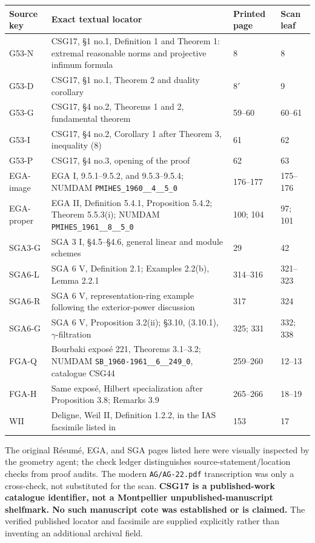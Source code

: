 \documentclass[11pt]{article}
\begin{document}
\begingroup\small
\begin{longtable}{p{2.1cm}p{7.7cm}p{1.5cm}p{1.5cm}}
\toprule
Source key & Exact textual locator & Printed page & Scan leaf\\\midrule
\endhead
G53-N & CSG17, \S1 no.1, Definition 1 and Theorem 1:
extremal reasonable norms and projective infimum formula & 8 & 8\\
G53-D & CSG17, \S1 no.1, Theorem 2 and duality corollary & $8'$ & 9\\
G53-G & CSG17, \S4 no.2, Theorems 1 and 2, fundamental theorem & 59--60 & 60--61\\
G53-I & CSG17, \S4 no.2, Corollary 1 after Theorem 3,
inequality (8) & 61 & 62\\
G53-P & CSG17, \S4 no.3, opening of the proof & 62 & 63\\
EGA-image & EGA I, 9.5.1--9.5.2, and 9.5.3--9.5.4;
NUMDAM \texttt{PMIHES\_1960\_\_4\_\_5\_0} & 176--177 & 175--176\\
EGA-proper & EGA II, Definition 5.4.1, Proposition 5.4.2;
Theorem 5.5.3(i); NUMDAM \texttt{PMIHES\_1961\_\_8\_\_5\_0}
& 100; 104 & 97; 101\\
SGA3-G & SGA 3 I, \S4.5--\S4.6, general linear and module schemes & 29 & 42\\
SGA6-L & SGA 6 V, Definition 2.1; Examples 2.2(b),
Lemma 2.2.1 & 314--316 & 321--323\\
SGA6-R & SGA 6 V, representation-ring example following the
exterior-power discussion & 317 & 324\\
SGA6-G & SGA 6 V, Proposition 3.2(ii);
\S3.10, (3.10.1), $\gamma$-filtration & 325; 331 & 332; 338\\
FGA-Q & Bourbaki expos\'e 221, Theorems 3.1--3.2;
NUMDAM \texttt{SB\_1960-1961\_\_6\_\_249\_0}, catalogue CSG44
& 259--260 & 12--13\\
FGA-H & Same expos\'e, Hilbert specialization after Proposition 3.8;
Remarks 3.9 & 265--266 & 18--19\\
WII & Deligne, Weil II, Definition 1.2.2, in the IAS facsimile
listed in \cite{WeilII} & 153 & 17\\
\bottomrule
\end{longtable}
\endgroup
The original R\'esum\'e, EGA, and SGA pages listed here were
visually inspected by the geometry agent; the check ledger
distinguishes source-statement/location checks from proof audits.
The modern \texttt{AG/AG-22.pdf} transcription was only a
cross-check, not substituted for the scan.
\textbf{CSG17 is a published-work catalogue identifier, not a
Montpellier unpublished-manuscript shelfmark. No such manuscript
cote was established or is claimed.} The verified published
locator and facsimile are supplied explicitly rather than
inventing an additional archival field.
\end{document}
